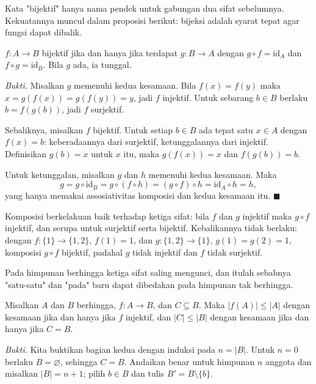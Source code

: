 Kata "bijektif" hanya nama pendek untuk gabungan dua sifat sebelumnya. Kekuatannya
muncul dalam proposisi berikut: bijeksi adalah syarat tepat agar fungsi dapat dibalik.

\begin{proposisi}
$f : A \to B$ bijektif jika dan hanya jika terdapat $g : B \to A$ dengan
$g \circ f = \mathrm{id}_A$ dan $f \circ g = \mathrm{id}_B$. Bila $g$ ada, ia tunggal.
\end{proposisi}
\par\smallskip\noindent\textit{Bukti.} Misalkan $g$ memenuhi kedua kesamaan. Bila
$f(x) = f(y)$ maka $x = g(f(x)) = g(f(y)) = y$, jadi $f$ injektif. Untuk sebarang
$b \in B$ berlaku $b = f(g(b))$, jadi $f$ surjektif.

Sebaliknya, misalkan $f$ bijektif. Untuk setiap $b \in B$ ada tepat satu $x \in A$
dengan $f(x) = b$: keberadaannya dari surjektif, ketunggalannya dari injektif.
Definisikan $g(b) = x$ untuk $x$ itu, maka $g(f(x)) = x$ dan $f(g(b)) = b$.

Untuk ketunggalan, misalkan $g$ dan $h$ memenuhi kedua kesamaan. Maka
\[
  g = g \circ \mathrm{id}_B = g \circ (f \circ h) = (g \circ f) \circ h
  = \mathrm{id}_A \circ h = h,
\]
yang hanya memakai assosiativitas komposisi dan kedua kesamaan itu.
\hfill$\blacksquare${\parfillskip=0pt\par}

Komposisi berkelakuan baik terhadap ketiga sifat: bila $f$ dan $g$ injektif maka
$g \circ f$ injektif, dan serupa untuk surjektif serta bijektif. Kebalikannya tidak
berlaku: dengan $f : \{1\} \to \{1,2\}$, $f(1) = 1$, dan $g : \{1,2\} \to \{1\}$,
$g(1) = g(2) = 1$, komposisi $g \circ f$ bijektif, padahal $g$ tidak injektif dan $f$
tidak surjektif.

Pada himpunan berhingga ketiga sifat saling mengunci, dan itulah sebabnya "satu-satu"
dan "pada" baru dapat dibedakan pada himpunan tak berhingga.

\begin{lemma}
Misalkan $A$ dan $B$ berhingga, $f : A \to B$, dan $C \subseteq B$. Maka
$|f(A)| \le |A|$ dengan kesamaan jika dan hanya jika $f$ injektif, dan
$|C| \le |B|$ dengan kesamaan jika dan hanya jika $C = B$.
\end{lemma}
\par\smallskip\noindent\textit{Bukti.} Kita buktikan bagian kedua dengan induksi pada
$n = |B|$. Untuk $n = 0$ berlaku $B = \varnothing$, sehingga $C = B$. Andaikan benar
untuk himpunan $n$ anggota dan misalkan $|B| = n+1$; pilih $b \in B$ dan tulis
$B' = B \setminus \{b\}$.

